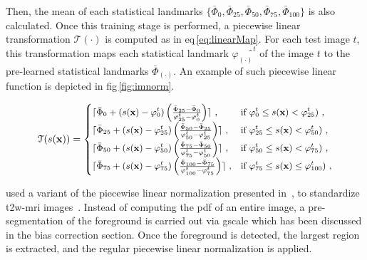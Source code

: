 Then, the mean of each statistical landmarks $\{ \bar{\Phi}_{0}, \bar{\Phi}_{25}, \bar{\Phi}_{50}, \bar{\Phi}_{75}, \bar{\Phi}_{100} \}$ is also calculated.
Once this training stage is performed, a piecewise linear transformation $\mathcal{T}(\cdot)$ is computed as in \acs{eq}\,\eqref{eq:linearMap}.
For each test image $t$, this transformation maps each statistical landmark $\varphi_{(\cdot)}̂^{t}$ of the image $t$ to the pre-learned statistical landmarks $\bar{\Phi}_{(\cdot)}$.
An example of such piecewise linear function is depicted in \acs{fig}\,\ref{fig:imnorm}.

\begin{equation}
\small
\mathcal{T}(s(\mathbf{x})) =
  \begin{cases}
    \lceil \bar{\Phi}_{0}+( s(\mathbf{x}) - \varphi_{0}^{t} ) \left( \frac{\bar{\Phi}_{25} - \bar{\Phi}_{0}}{\varphi_{25}^{t} - \varphi_{0}^{t}} \right) \rceil \ , & \text{if $\varphi_{0}^{t} \leq s(\mathbf{x})<\varphi_{25}^{t})$} \ , \\
    \lceil \bar{\Phi}_{25}+( s(\mathbf{x}) - \varphi_{25}^{t} ) \left( \frac{\bar{\Phi}_{50} - \bar{\Phi}_{25}}{\varphi_{50}^{t} - \varphi_{25}^{t}} \right) \rceil \ , & \text{if $\varphi_{25}^{t} \leq s(\mathbf{x})<\varphi_{50}^{t})$} \ , \\
    \lceil \bar{\Phi}_{50}+( s(\mathbf{x}) - \varphi_{50}^{t} ) \left( \frac{\bar{\Phi}_{75} - \bar{\Phi}_{50}}{\varphi_{75}^{t} - \varphi_{50}^{t}} \right) \rceil \ , & \text{if $\varphi_{50}^{t} \leq s(\mathbf{x})<\varphi_{75}^{t})$} \ , \\
    \lceil \bar{\Phi}_{75}+( s(\mathbf{x}) - \varphi_{75}^{t} ) \left( \frac{\bar{\Phi}_{100} - \bar{\Phi}_{75}}{\varphi_{100}^{t} - \varphi_{75}^{t}} \right) \rceil \ , & \text{if $\varphi_{75}^{t} \leq s(\mathbf{x})\leq \varphi_{100}^{t})$} \ ,
  \end{cases}
  \label{eq:linearMap}
\end{equation}

\citeauthor{Viswanath2012} used a variant of the piecewise linear normalization presented in~\cite{Madabhushi2006a}, to standardize \ac{t2w}-\ac{mri} images~\cite{Viswanath2009,Viswanath2011,Viswanath2012}.
Instead of computing the \ac{pdf} of an entire image, a pre-segmentation of the foreground is carried out via \ac{gscale} which has been discussed in the bias correction section.
Once the foreground is detected, the largest region is extracted, and the regular piecewise linear normalization is applied.

